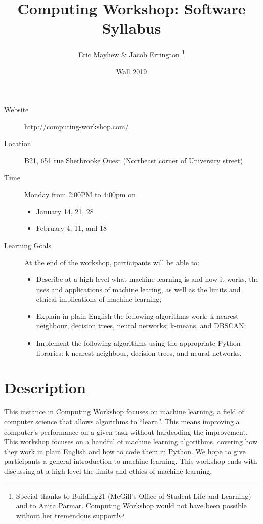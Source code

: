 \documentclass[11pt]{article}
\author{%
  Eric Mayhew \& Jacob Errington%
  \footnote{%
    Special thanks to Building21 (McGill's Office of Student Life and Learning)
    and to Anita Parmar.
    Computing Workshop would not have been possible without her tremendous
    support!
  }
}
\title{Computing Workshop: Software Syllabus}
\date{Wall 2019}
\begin{document}
\maketitle

\begin{description}
  \item[Website]
    \url{http://computing-workshop.com/}

  \item[Location]
    B21, 651 rue Sherbrooke Ouest
    (Northeast corner of University street)

  \item[Time]
    Monday from 2:00PM to 4:00pm on
    \begin{itemize}
    \item January 14, 21, 28
    \item February 4, 11, and 18
    \end{itemize}

  \item[Learning Goals]
    At the end of the workshop, participants will be able to:
    \begin{itemize}
      \item Describe at a high level what machine learning is and how it works, the uses and applications of machine learing,
        as well as the limits and ethical implications of machine learning;
      \item Explain in plain English the following algorithms work: k-nearest neighbour, decision trees, neural networks;
        k-means, and DBSCAN;
      \item Implement the following algorithms using the appropriate Python libraries: k-nearest neighbour, decision trees, and neural networks.
    \end{itemize}

\end{description}

\section*{Description}

This instance in Computing Workshop focuses on machine
learning, a field of computer science that allows algorithms to ``learn''. This
means improving a computer's performance on a given task without hardcoding the
improvement. This workshop focuses on a handful of machine learning algorithms, covering how they work in plain English and
how to code them in Python. We hope to give participants a general introduction to machine learning. This workshop ends with
discussing at a high level the limits and ethics of machine learning.
\end{document}
